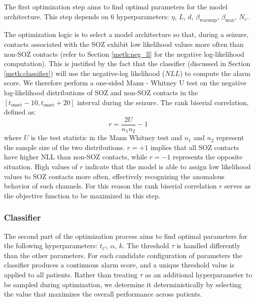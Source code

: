 The first optimization step aims to find optimal parameters for the model
architecture.
This step depends on 6 hyperparameters: $\eta$, $L$, $d$,
$\beta_{\text{warmup}}$, $\beta_{\text{max}}$, $N_c$.

The optimization logic is to select a model architecture so that, during a 
seizure, contacts associated with the SOZ exhibit low likelihood values
more often than non-SOZ contacts (refer to Section \ref{meth:neg_ll} for the
negative log-likelihood computation).
This is justified by the fact that the classifier (discussed in Section
\ref{meth:classifier}) will use the negative-log likelihood ($NLL$) to compute the
alarm score.
We therefore perform a one-sided Mann - Whitney U test \cite{mw} on the negative
log-likelihood distributions of SOZ and non-SOZ contacts in the 
$[t_{\text{onset}} - 10, t_{\text{onset}} + 20]$ interval during the seizure.
The rank biserial correlation, defined as:
\begin{equation}
    r = \frac{2U}{n_1n_2}-1
\end{equation}
where $U$ is the test statistic in the Mann Whitney test and $n_1$ and $n_2$
represent the sample size of the two distributions.
$r=+1$ implies that all SOZ contacts have higher NLL than non-SOZ contacts,
while $r=-1$ represents the opposite situation.
High values of $r$ indicate that the model is able to assign low likelihood
values to SOZ contacts more often, effectively recognizing the anomalous behavior
of such channels.
For this reason the rank biserial correlation $r$ serves as the objective
function to be maximized in this step.

\subsubsection{Classifier}  \label{meth:opt:classifier}

The second part of the optimization process aims to find optimal parameters for
the following hyperparameters: $t_C$, $\alpha$, $k$.
The threshold $\tau$ is handled differently than the other parameters.
For each candidate configuration of parameters
the classifier produces a continuous alarm score, and a unique threshold value
is applied to all patients.
Rather than treating $\tau$ as an additional hyperparameter to be sampled during
optimization, we determine it deterministically by selecting the value that 
maximizes the overall performance across patients.

